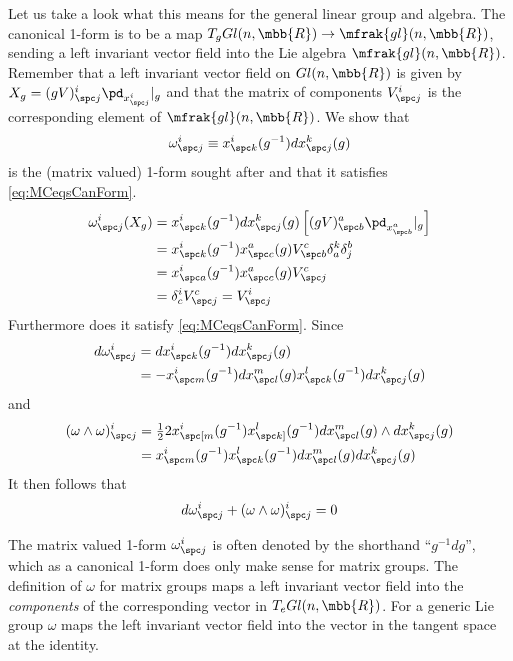 \documentclass[10pt,reqno]{amsart}
\numberwithin{equation}{section}
\begin{document}
\begin{example}
	Let us take a look what this means for the general linear group 
	and algebra. The canonical 1-form is to be a map $T_g 
	Gl(n,\mbb{R}) \rightarrow \mfrak{gl}(n,\mbb{R})$, sending a 
	left invariant vector field into the Lie algebra 
	$\mfrak{gl}(n,\mbb{R})$. Remember that a left invariant vector 
	field on $Gl(n,\mbb{R})$ is given by $X_g = (gV)^i_{\spc j} 
	\pd_{x^i_{\spc j}}|_g$ and that the matrix of components 
	$V^i_{\spc j}$ is the corresponding element of 
	$\mfrak{gl}(n,\mbb{R})$. We show that
	\begin{equation}
		\omega^i_{\spc j} \equiv x^i_{\spc k}(g^{-1}) dx^k_{\spc 
			j}(g)
	\end{equation}
	is the (matrix valued) 1-form sought after and that it 
	satisfies \eqref{eq:MCeqsCanForm}.
	\begin{displaymath}
		\begin{split}
			\omega^i_{\spc j}(X_g) &= x^i_{\spc k}(g^{-1}) dx^k_{\spc 
				j}(g)
	\left[ (gV)^a_{\spc b} \pd_{x^a_{\spc b}}|_g \right] \\
	&= x^i_{\spc k}(g^{-1})x^a_{\spc c}(g) V^c_{\spc b} \delta^k_a 
	\delta^b_j \\
	&= x^i_{\spc a}(g^{-1})x^a_{\spc c}(g) V^c_{\spc j} \\
	&= \delta^i_c V^c_{\spc j} = V^i_{\spc j}
		\end{split}
	\end{displaymath}
	Furthermore does it satisfy \eqref{eq:MCeqsCanForm}. Since
	\begin{displaymath}
		\begin{split}
			d\omega^i_{\spc j} &= dx^i_{\spc k}(g^{-1}) dx^k_{\spc     
				j}(g) \\
			&= - x^i_{\spc m}(g^{-1}) dx^m_{\spc l}(g)
			x^l_{\spc k}(g^{-1}) dx^k_{\spc j}(g)
		\end{split}
	\end{displaymath}
	and
	\begin{displaymath}
		\begin{split}
			(\omega \wedge \omega)^i_{\spc j} &=
			\tfrac{1}{2} 2x^i_{\spc [m}(g^{-1}) x^l_{\spc k]}(g^{-1})
	dx^m_{\spc l}(g) \wedge dx^k_{\spc j}(g) \\
			&= x^i_{\spc m}(g^{-1}) x^l_{\spc k}(g^{-1})
	dx^m_{\spc l}(g)dx^k_{\spc j}(g)
		\end{split}
	\end{displaymath}
	It then follows that
	\begin{equation}
		d\omega^i_{\spc j} + (\omega \wedge \omega)^i_{\spc j} = 0
	\end{equation}
  
	The matrix valued 1-form $\omega^i_{\spc j}$ is often denoted 
	by the shorthand ``$g^{-1}dg$'', which as a canonical 1-form 
	does only make sense for matrix groups. The definition of 
	$\omega$ for matrix groups maps a left invariant vector field 
	into the \emph{components} of the corresponding vector in $T_e 
	Gl(n,\mbb{R})$.  For a generic Lie group $\omega$ maps the left 
	invariant vector field into the vector in the tangent space at 
	the identity.
\end{example}
\end{document}
